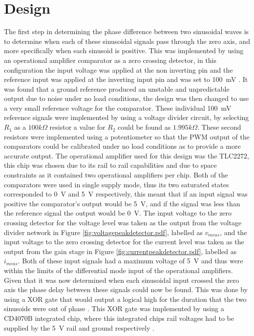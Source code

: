 \section{Design} \label{sec:design_phasetransducer}
The first step in determining the phase difference between two sinusoidal waves is to determine when each of these sinusoidal signals pass through the zero axis, and more specifically when each sinusoid is positive. This was implemented by using an operational amplifier comparator as a zero crossing detector, in this configuration the input voltage was applied at the non inverting pin and the reference input was applied at the inverting input pin and was set to \SI{100}{\milli \volt} \cite{ZeroCrossingDetector}. It was found that a ground reference produced an unstable and unpredictable output due to noise under no load conditions, the design was then changed to use a very small reference voltage for the comparator. These individual \SI{100}{\milli \volt} reference signals were implemented by using a voltage divider circuit, by selecting $R_1$ as a $100k\Omega$ resistor a value for $R_2$ could be found as $1.995k\Omega$. These second resistors were implemented using a potentiometer so that the PWM output of the comparators could be calibrated under no load conditions as to provide a more accurate output. The operational amplifier used for this design was the TLC2272, this chip was chosen due to its rail to rail capabilities and due to space constraints as it contained two operational amplifiers per chip. Both of the comparators were used in single supply mode, thus its two saturated states corresponded to \SI{0}{\volt} and \SI{5}{\volt} respectively, this meant that if an input signal was positive the comparator's output would be \SI{5}{\volt}, and if the signal was less than the reference signal the output would be \SI{0}{\volt}. \vspace{4mm} \newline
The input voltage to the zero crossing detector for the voltage level was taken as the output from the voltage divider network in Figure \ref{fig:voltagepeakdetector.pdf}, labelled as $v_{meas}$, and the input voltage to the zero crossing detector for the current level was taken as the output from the gain stage in Figure \ref{fig:currentpeakdetector.pdf}, labelled as $i_{meas}$. Both of these input signals had a maximum voltage of \SI{5}{\volt} and thus were within the limits of the differential mode input of the operational amplifiers. Given that it was now determined when each sinusoidal input crossed the zero axis the phase delay between these signals could now be found. This was done by using a XOR gate that would output a logical high for the duration that the two sinusoids were out of phase \cite{PWMref}. This XOR gate was implemented by using a CD4070B integrated chip, where this integrated chips rail voltages had to be supplied by the \SI{5}{\volt} rail and ground respectively \cite{CD4070B:2003}. \vspace{4mm} \newline
